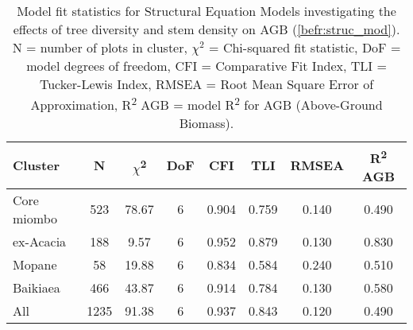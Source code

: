 \begin{table}
	\caption[Model fit statistics per vegetation type]{Model fit statistics for Structural Equation Models investigating the effects of tree diversity and stem density on AGB (\autoref{befr:struc_mod}). N = number of plots in cluster, $\chi^{2}$ = Chi-squared fit statistic, DoF = model degrees of freedom, CFI = Comparative Fit Index, TLI = Tucker-Lewis Index, RMSEA = Root Mean Square Error of Approximation, R\textsuperscript{2} AGB = model R\textsuperscript{2} for AGB (Above-Ground Biomass).} 
	\label{befr:struc_model_fit_clust_stats} 
	\begin{tabular}{lS[table-format=4.0]S[table-format=2.2]S[table-format=1.0]S[table-format=1.3]S[table-format=1.3]S[table-format=1.3]S[table-format=1.3]} 
\toprule
{Cluster} & {N} & {$\chi$\textsuperscript{2}} & {DoF} & {CFI} & {TLI} & {RMSEA} & {R\textsuperscript{2} AGB} \\
\midrule
Core miombo & 523 & 78.67 & 6 & 0.904 & 0.759 & 0.140 & 0.490 \\ 
ex-Acacia & 188 & 9.57 & 6 & 0.952 & 0.879 & 0.130 & 0.830 \\ 
Mopane & 58 & 19.88 & 6 & 0.834 & 0.584 & 0.240 & 0.510 \\ 
Baikiaea & 466 & 43.87 & 6 & 0.914 & 0.784 & 0.130 & 0.580 \\ 
All & 1235 & 91.38 & 6 & 0.937 & 0.843 & 0.120 & 0.490 \\ 
\bottomrule
\end{tabular} 
\end{table} 

